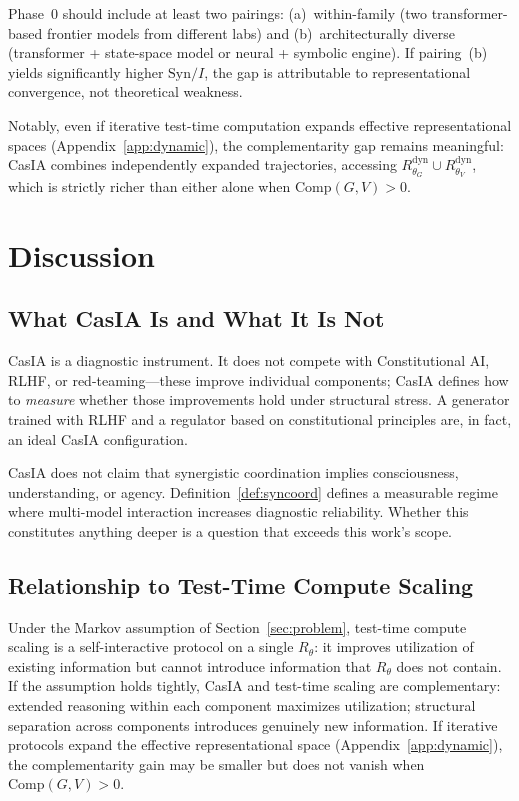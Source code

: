 \documentclass[11pt,a4paper]{article}
\theoremstyle{definition}
\newcommand{\Rtheta}{R_\theta}
\newcommand{\thetaG}{\theta_G}
\newcommand{\thetaV}{\theta_V}
\begin{document}
Phase~0 should include at least two pairings: (a)~within-family (two transformer-based frontier models from different labs) and (b)~architecturally diverse (transformer + state-space model or neural + symbolic engine). If pairing~(b) yields significantly higher $\mathrm{Syn}/I$, the gap is attributable to representational convergence, not theoretical weakness.

Notably, even if iterative test-time computation expands effective representational spaces (Appendix~\ref{app:dynamic}), the complementarity gap remains meaningful: CasIA combines independently expanded trajectories, accessing $R_{\thetaG}^\text{dyn} \cup R_{\thetaV}^\text{dyn}$, which is strictly richer than either alone when $\mathrm{Comp}(G,V) > 0$.


\section{Discussion}
\label{sec:discussion}

\subsection{What CasIA Is and What It Is Not}

CasIA is a diagnostic instrument. It does not compete with Constitutional AI, RLHF, or red-teaming---these improve individual components; CasIA defines how to \emph{measure} whether those improvements hold under structural stress. A generator trained with RLHF and a regulator based on constitutional principles are, in fact, an ideal CasIA configuration.

CasIA does not claim that synergistic coordination implies consciousness, understanding, or agency. Definition~\ref{def:syncoord} defines a measurable regime where multi-model interaction increases diagnostic reliability. Whether this constitutes anything deeper is a question that exceeds this work's scope.

\subsection{Relationship to Test-Time Compute Scaling}

Under the Markov assumption of Section~\ref{sec:problem}, test-time compute scaling is a self-interactive protocol on a single $\Rtheta$: it improves utilization of existing information but cannot introduce information that $\Rtheta$ does not contain. If the assumption holds tightly, CasIA and test-time scaling are complementary: extended reasoning within each component maximizes utilization; structural separation across components introduces genuinely new information. If iterative protocols expand the effective representational space (Appendix~\ref{app:dynamic}), the complementarity gain may be smaller but does not vanish when $\mathrm{Comp}(G,V) > 0$.
\end{document}
